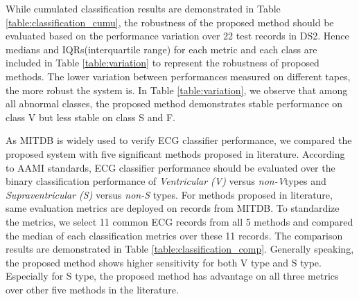 {While cumulated classification results are demonstrated in Table \ref{table:classification_cumu}, the robustness of the proposed method should be evaluated based on the performance variation over 22 test records in DS2. Hence medians and IQRs(interquartile range) for each metric and each class are included in Table \ref{table:variation} to represent the robustness of proposed methods. The lower variation between performances measured on different tapes, the more robust the system is. In Table \ref{table:variation}, we observe that among all abnormal classes, the proposed method demonstrates stable performance on class V but less stable on class S and F.

\begin{table}[b]
\centering
\caption{Classification Performance and Within-Set Variation of Proposed System}
\label{table:variation}
\end{table}

As MITDB is widely used to verify ECG classifier performance, we compared the proposed system with five significant methods proposed in literature. According to AAMI standards, ECG classifier performance should be evaluated over the binary classification performance of \textit{Ventricular (V)} versus \textit{non-V}types and \textit{Supraventricular (S)} versus \textit{non-S} types. For methods proposed in literature, same evaluation metrics are deployed on records from MITDB. To standardize the metrics, we select 11 common ECG records from all 5 methods and compared the median of each classification metrics over these 11 records. The comparison results are demonstrated in Table \ref{table:classification_comp}. Generally speaking, the proposed method shows higher sensitivity for both V type and S type. Especially for S type, the proposed method has advantage on all three metrics over other five methods in the literature.


}
